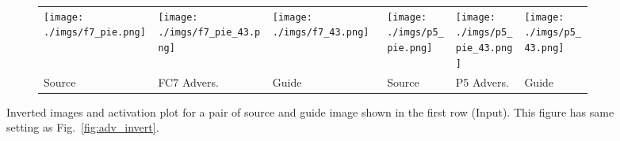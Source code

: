 \documentclass{article} %
\begin{document}
\begin{figure}[h!]
\begin{subfigure}[t]{\linewidth}
{\begin{tabular}
\hline
\end{tabular}
}
\end{subfigure}
\vspace*{0.2cm}

\begin{subfigure}[t]{\linewidth}{
\centering
\renewcommand{\arraystretch}{1}
\setlength\tabcolsep{.1pt}
\begin{tabular}{
|>{\centering\arraybackslash}m{0.205\linewidth}
>{\centering\arraybackslash}m{0.205\linewidth}
>{\centering\arraybackslash}m{0.205\linewidth}|
>{\centering\arraybackslash}m{0.125\linewidth}
>{\centering\arraybackslash}m{0.125\linewidth}
>{\centering\arraybackslash}m{0.125\linewidth}|
}
\hline
\texttt{[image: ./imgs/f7\_pie.png]} &
\texttt{[image: ./imgs/f7\_pie\_43.png]} &
\texttt{[image: ./imgs/f7\_43.png]} &
\texttt{[image: ./imgs/p5\_pie.png]} &
\texttt{[image: ./imgs/p5\_pie\_43.png]} &
\texttt{[image: ./imgs/p5\_43.png]}\\
Source & FC7 Advers. & Guide & Source & P5 Advers. & Guide \\ \hline
\end{tabular}
}
\end{subfigure}
\caption{
    Inverted images and activation plot for a pair of source and guide image 
    shown in the first row (Input). This figure has same setting as 
    Fig.~\ref{fig:adv_invert}.
}

\label{fig:adv_invert2}
\end{figure}\begin{figure*}[h!]


\end{figure*}
\end{document}
